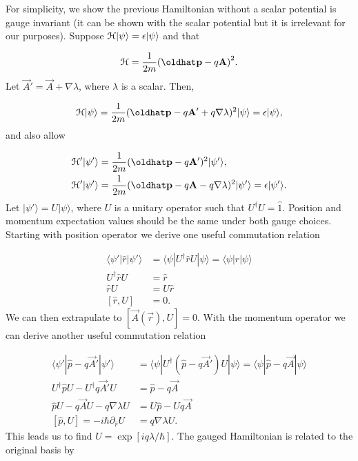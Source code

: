 For simplicity, we show the previous Hamiltonian without a scalar potential is gauge invariant (it can be shown with the scalar potential but it is irrelevant for our purposes).
Suppose
$\mathcal{H}|\psi \rangle = \epsilon |\psi \rangle$
and that

\begin{equation}
  \ham = \dfrac{1}{2m} {(\hat{p} - q \vec{A})}^2.
\end{equation}
Let
$\vec{A}' = \vec{A}+\nabla\lambda$,
where $\lambda$ is a scalar.
Then,

\begin{equation}
  \ham |\psi\rangle = \dfrac{1}{2m} (\hat{p} - q \vec{A}' + q \nabla \lambda)^2 |\psi\rangle = \epsilon |\psi\rangle,
\end{equation}
and also allow

\begin{align}
  \ham' |\psi'\rangle &= \dfrac{1}{2m} (\hat{p} - q \vec{A}')^2 |\psi'\rangle, \nonumber \\
  \ham' |\psi'\rangle &= \dfrac{1}{2m} (\hat{p} - q \vec{A} - q \nabla \lambda)^2 |\psi'\rangle = \epsilon |\psi'\rangle.
\end{align}
Let
$|\psi'\rangle = U |\psi\rangle$,
where $U$ is a unitary operator such that
$U^{\dagger} U = \hat{1}$.
Position and momentum expectation values should be the same under both gauge choices.
Starting with position operator we derive one useful commutation relation

\begin{align}
  \langle \psi' | \hat{r} | \psi'\rangle &= \langle \psi | U^{\dagger} \hat{r} U | \psi\rangle = \langle \psi | \hat{r} | \psi\rangle \nonumber \\
  U^{\dagger} \hat{r} U &= \hat{r} \nonumber \\
  \hat{r} U &= U \hat{r} \nonumber \\
  [\hat{r},U] &= 0.
\end{align}
We can then extrapulate to
$[\vec{A}{(\vec{r})},U] = 0$.
With the momentum operator we can derive another useful commutation relation

\begin{align}
  \langle \psi' | \hat{p}-q \vec{A}' | \psi'\rangle &= \langle \psi | U^{\dagger} (\hat{p} - q \vec{A}') U | \psi\rangle = \langle \psi | \hat{p} - q \vec{A} | \psi\rangle \nonumber \\
  U^{\dagger} \hat{p} U - U^{\dagger} q\vec{A}'U &= \hat{p} - q \vec{A} \nonumber \\
  \hat{p} U - q\vec{A} U - q\nabla\lambda U &= U \hat{p} - U q \vec{A} \nonumber \\
  [\hat{p},U] = -i\hbar\partial_{\hat{r}} U &= q\nabla\lambda U.
\end{align}
This leads us to find
$U = \exp[iq\lambda/\hbar]$.
The gauged Hamiltonian is related to the original basis by

